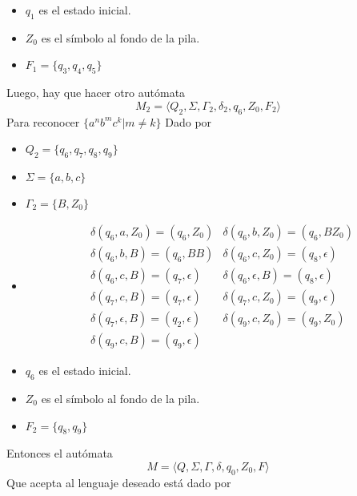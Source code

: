 \documentclass{article}
\begin{document}
\begin{enumerate}
{\begin{enumerate}
{\begin{itemize}
	         	
	         	\item {
	         		$q_1$ es el estado inicial.
	         	}
	         	\item {
	         		$Z_0$ es el símbolo al fondo de la pila.
	         	}
	         	\item {
	         		$F_1 = \{q_3, q_4, q_5\}$
	         	}
	         \end{itemize}
	     
	     	Luego, hay que hacer otro autómata 
	     	\[M_2 = \langle Q_2 , \Sigma, \Gamma_2 , \delta_2, q_6 , Z_0,
	     	F_2\rangle\]
	     	Para reconocer $\{a^nb^mc^k | m \neq k\}$
	     	Dado por 
	     	\begin{itemize}
	     		\item {
	     			$Q_2 = \{q_6, q_7, q_8, q_9\}$
     			}
     		
     			\item {
     				$\Sigma = \{a, b, c\}$
     			}
     			\item {
     				$\Gamma_2 = \{B, Z_0\}$
     			}
	     		\item {
	     			\begin{align*}
	     			&\delta (q_6, a, Z_0) = (q_6, Z_0)
	     			&\delta (q_6, b, Z_0) = (q_6, BZ_0) \\
	     			&\delta (q_6, b, B) = (q_6, BB)
	     			&\delta (q_6, c, Z_0) = (q_8, \epsilon) \\
	     			&\delta (q_6, c, B) = (q_7, \epsilon)
	     			&\delta (q_6, \epsilon, B) = (q_8, \epsilon) \\
	     			&\delta (q_7, c, B) = (q_7, \epsilon)
	     			&\delta (q_7, c, Z_0) = (q_9, \epsilon) \\
	     			&\delta (q_7, \epsilon, B) = (q_2, \epsilon)
	     			&\delta (q_9, c, Z_0) = (q_9, Z_0) \\
	     			&\delta (q_9, c, B) = (q_9, \epsilon)
	     			\end{align*}
	     		}
	     		\item {
	     			$q_6$ es el estado inicial.
	     		}
	     		\item {
	     			$Z_0$ es el símbolo al fondo de la pila.
	     		}
	     		\item {
	     			$F_2 = \{q_8, q_9\}$
	     		}
	     	\end{itemize}
	            
	        Entonces el autómata 
	        \[M = \langle Q , \Sigma, \Gamma , \delta, q_0 , Z_0,
	        F\rangle\]
	        Que acepta al lenguaje deseado está dado por
	        
}
\end{enumerate}}
\end{enumerate}
\end{document}
